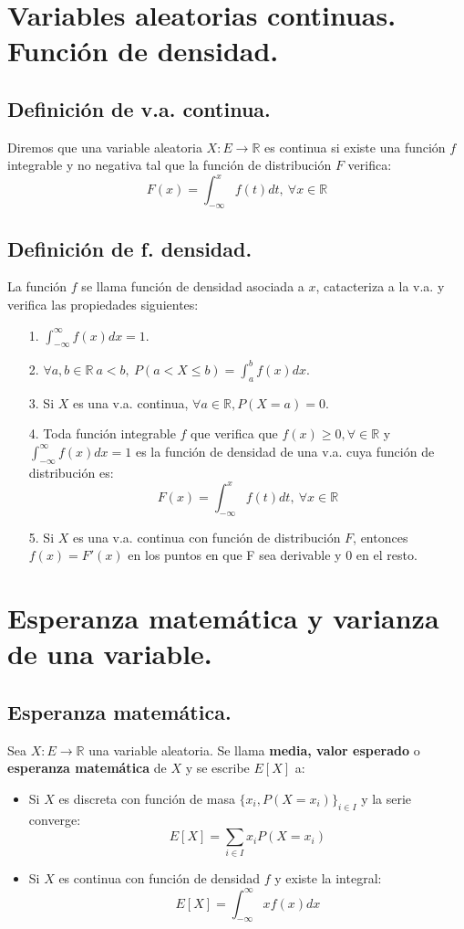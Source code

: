 \section{Variables aleatorias continuas. Función de densidad.}
\subsection{Definición de v.a. continua.}
Diremos que una variable aleatoria $X:E\to\mathbb{R}$ es continua si existe una función $f$ integrable y no negativa tal que la función de distribución $F$ verifica:
\[F(x)=\int_{-\infty}^{x} f(t)dt,\: \forall x \in \mathbb{R}\]

\subsection{Definición de f. densidad.}
La función $f$ se llama función de densidad asociada a $x$, catacteriza a la v.a. y verifica las propiedades siguientes:
\begin{itemize}
\item[1.]$\int_{-\infty}^{\infty} f(x)dx = 1$.
\item[2.]$\forall a,b \in \mathbb{R}\: a<b,\: P(a < X \leq b) = \int_{a}^{b} f(x)dx$.
\item[3.]Si $X$ es una v.a. continua, $\forall a \in \mathbb{R}, P(X=a)=0$.
\item[4.]Toda función integrable $f$ que verifica que $f(x) \geq 0, \forall  \in \mathbb{R}$ y $\int_{-\infty}^{\infty} f(x)dx=1$ es la función de densidad de una v.a. cuya función de distribución es:
\[F(x)=\int_{-\infty}^{x} f(t)dt, \:\forall x \in \mathbb{R}\]
\item[5.]Si $X$ es una v.a. continua con función de distribución $F$, entonces $f(x)=F'(x)$ en los puntos en que F sea derivable y 0 en el resto.
\end{itemize}


\section{Esperanza matemática y varianza de una variable.}
\subsection{Esperanza matemática.}
Sea $X:E\to \mathbb{R}$ una variable aleatoria. Se llama \textbf{media, valor esperado} o \textbf{esperanza matemática} de $X$ y se escribe $E[X]$ a:
\begin{itemize}
\item Si $X$ es discreta con función de masa $\{x_{i}, P(X=x_{i})\}_{i \in I}$ y la serie converge:
\[E[X]=\sum_{i \in I} x_{i}P(X=x_{i})\]
\item Si $X$ es continua con función de densidad $f$ y existe la integral:
\[E[X]=\int_{-\infty}^{\infty}xf(x)dx\]
\end{itemize}

